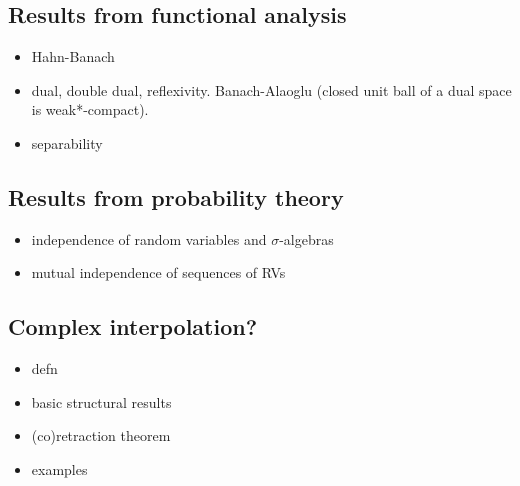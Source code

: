 \subsection{Results from functional analysis}

\begin{itemize}
\item Hahn-Banach
\item dual, double dual, reflexivity. Banach-Alaoglu (closed unit ball of a dual space is weak*-compact).
\item separability
\end{itemize}

\subsection{Results from probability theory}

\begin{itemize}
\item independence of random variables and $\sigma$-algebras
\item mutual independence of sequences of RVs
\end{itemize}

\subsection{Complex interpolation?}

\begin{itemize}
\item defn
\item basic structural results
\item (co)retraction theorem
\item examples 
\end{itemize}


